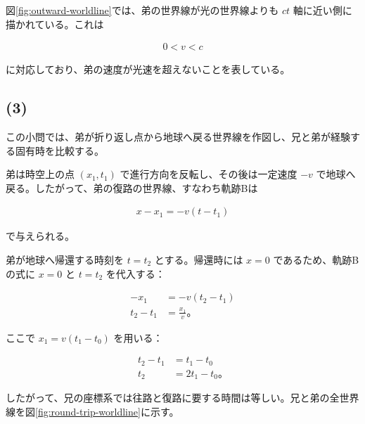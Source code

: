\documentclass[platex,dvipdfmx,a4paper]{jsarticle}
\begin{document}
図\ref{fig:outward-worldline}では、弟の世界線が光の世界線よりも \(ct\) 軸に近い側に描かれている。これは

\begin{align*}
  0<v<c
\end{align*}

に対応しており、弟の速度が光速を超えないことを表している。

\subsection*{(3)}

この小問では、弟が折り返し点から地球へ戻る世界線を作図し、兄と弟が経験する固有時を比較する。

弟は時空上の点 \((x_1,t_1)\) で進行方向を反転し、その後は一定速度 \(-v\) で地球へ戻る。したがって、弟の復路の世界線、すなわち軌跡Bは

\begin{align*}
  x-x_1=-v(t-t_1)
\end{align*}

で与えられる。

弟が地球へ帰還する時刻を \(t=t_2\) とする。帰還時には \(x=0\) であるため、軌跡Bの式に \(x=0\) と \(t=t_2\) を代入する：

\begin{align*}
  -x_1&=-v(t_2-t_1) \\
  t_2-t_1&=\frac{x_1}{v}。
\end{align*}

ここで \(x_1=v(t_1-t_0)\) を用いる：

\begin{align*}
  t_2-t_1&=t_1-t_0 \\
  t_2&=2t_1-t_0。
\end{align*}

したがって、兄の座標系では往路と復路に要する時間は等しい。兄と弟の全世界線を図\ref{fig:round-trip-worldline}に示す。
\end{document}
